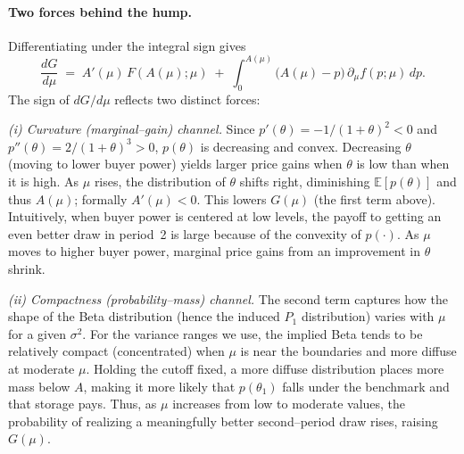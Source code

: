 \paragraph{Two forces behind the hump.}
Differentiating under the integral sign gives
\[
\frac{dG}{d\mu}
\;=\; A'(\mu)\,F\!\left(A(\mu);\mu\right)
\;+\; \int_{0}^{A(\mu)} \!\big(A(\mu)-p\big)\,\partial_{\mu} f(p;\mu)\,dp.
\]
The sign of $dG/d\mu$ reflects two distinct forces:

\medskip
\noindent\emph{(i) Curvature (marginal--gain) channel.} Since $p'(\theta)=-1/(1+\theta)^2<0$ and $p''(\theta)=2/(1+\theta)^3>0$, $p(\theta)$ is decreasing and convex. Decreasing $\theta$ (moving to lower buyer power) yields larger price gains when $\theta$ is low than when it is high. As $\mu$ rises, the distribution of $\theta$ shifts right, diminishing $\mathbb{E}[p(\theta)]$ and thus $A(\mu)$; formally $A'(\mu)<0$. This lowers $G(\mu)$ (the first term above). Intuitively, when buyer power is centered at low levels, the payoff to getting an even better draw in period~2 is large because of the convexity of $p(\cdot)$. As $\mu$ moves to higher buyer power, marginal price gains from an improvement in $\theta$ shrink.

\medskip
\noindent\emph{(ii) Compactness (probability--mass) channel.} The second term captures how the shape of the Beta distribution (hence the induced $P_1$ distribution) varies with $\mu$ for a given $\sigma^2$. For the variance ranges we use, the implied Beta tends to be relatively compact (concentrated) when $\mu$ is near the boundaries and more diffuse at moderate $\mu$. Holding the cutoff fixed, a more diffuse distribution places more mass below $A$, making it more likely that $p(\theta_1)$ falls under the benchmark and that storage pays. Thus, as $\mu$ increases from low to moderate values, the probability of realizing a meaningfully better second--period draw rises, raising $G(\mu)$.

